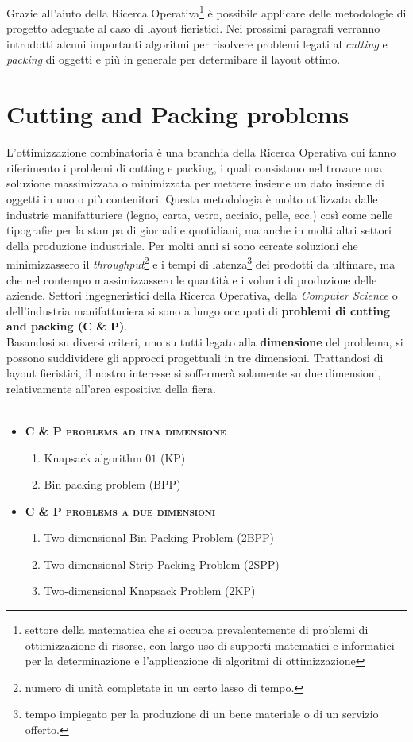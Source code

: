 \documentclass[12pt,a4paper,openright,twoside]{report}
\begin{document}
Grazie all'aiuto della Ricerca Operativa\footnote{settore della matematica che si occupa prevalentemente di problemi di ottimizzazione di risorse, con largo uso di supporti matematici e informatici per la determinazione e l'applicazione di algoritmi di ottimizzazione} \`{e} possibile applicare delle metodologie di progetto adeguate al caso di layout fieristici. Nei prossimi paragrafi verranno introdotti alcuni importanti algoritmi per risolvere problemi legati al \textit{cutting} e \textit{packing} di oggetti e pi\`{u} in generale per determibare il layout ottimo. 

\section{Cutting and Packing problems}
L'ottimizzazione combinatoria \`{e} una branchia della Ricerca Operativa cui fanno riferimento i problemi di cutting e packing, i quali consistono nel trovare una soluzione massimizzata o minimizzata per mettere insieme un dato insieme di oggetti in uno o pi\`{u} contenitori.
Questa metodologia \`{e} molto utilizzata dalle industrie manifatturiere (legno, carta, vetro, acciaio, pelle, ecc.) cos\`{i} come nelle tipografie per la stampa di giornali e quotidiani, ma anche in molti altri settori della produzione industriale. Per molti anni si sono cercate soluzioni che minimizzassero il \textit{throughput}\footnote{numero di unit\`{a} completate in un certo lasso di tempo.} e i tempi di latenza\footnote{tempo impiegato per la produzione di un bene materiale o di un servizio offerto.} dei prodotti da ultimare, ma che nel contempo massimizzassero le quantit\`{a} e i volumi di produzione delle aziende. Settori ingegneristici della Ricerca Operativa, della \textit{Computer Science} o dell'industria manifatturiera si sono a lungo occupati di \textbf{problemi di cutting and packing (C \& P)}.\\
Basandosi su diversi criteri, uno su tutti legato alla \textbf{dimensione} del problema, si possono suddividere gli approcci progettuali in tre dimensioni. Trattandosi di layout fieristici, il nostro interesse si soffermer\`{a} solamente su due dimensioni, relativamente all'area espositiva della fiera.\\
\\
\begin{itemize}
\centering
\item \textbf{\textsc{C \& P problems ad una dimensione}}
\begin{enumerate}
\centering
\item Knapsack algorithm $01$ (KP)
\item Bin packing problem (BPP)
\end{enumerate}
\item \textbf{\textsc{C \& P problems a due dimensioni}}
\begin{enumerate}
\centering
\item Two-dimensional Bin Packing Problem (2BPP)
\item Two-dimensional Strip Packing Problem (2SPP)
\item Two-dimensional Knapsack Problem (2KP)
\end{enumerate}
\end{itemize}
\end{document}
